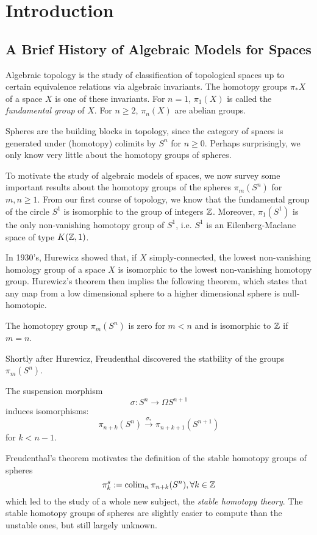 \chapter{Introduction}

\section{A Brief History of Algebraic Models for Spaces}

Algebraic topology is the study of classification of topological spaces up to certain equivalence relations via algebraic invariants. 
The homotopy groups $\pi_* X$ of a space $X$ is one of these invariants.
For $n=1$, $\pi_1(X)$ is called the \emph{fundamental group} of $X$. For $n\geq 2$, $\pi_n(X)$ are abelian groups. 

Spheres are the building blocks in topology, since the category of spaces is generated under (homotopy) colimits by $S^n$ for $n\geq 0$. Perhaps surprisingly, we only know very little about the homotopy groups of spheres. 

To motivate the study of algebraic models of spaces, we now survey some important results about the homotopy groups of the spheres $\pi_m(S^n)$ for $m,n \geq 1$.
From our first course of topology, we know that the fundamental group of the circle $S^1$ is isomorphic to the group of integers ${\mathbb{Z}}$. Moreover, $\pi_1( S^1)$ is the only non-vanishing homotopy group of $S^1$, i.e. $S^1$ is an Eilenberg-Maclane space of type $K({\mathbb{Z}},1)$.

In 1930's, Hurewicz showed that, if $X$ simply-connected,  the lowest non-vanishing homology group of a space $X$ is isomorphic to the lowest non-vanishing homotopy group. Hurewicz's theorem then implies the following theorem, which states that any map from a low dimensional sphere to a higher dimensional sphere is null-homotopic.
\begin{theorem}
    [Hurewicz]
    The homotopry group $\pi_m(S^n)$ is zero for $m<n$ and is isomorphic to ${\mathbb{Z}}$ if $m=n$.
\end{theorem}
\clearpage

Shortly after Hurewicz, Freudenthal discovered the statbility of the groups $\pi_m(S^n)$.
\begin{theorem}
    The suspension morphism 
    $$
    \sigma: S^n \to \Omega S^{n+1}
    $$
    induces isomorphisms:
    $$
    \pi_{n+k}(S^n) \xrightarrow{\sigma_*} 
    \pi_{n+k+1}(S^{n+1})
    $$
    for $k<n-1$.
\end{theorem}
Freudenthal's theorem motivates the definition of the stable homotopy groups of spheres
$$
\pi^{s}_{k}:= \operatorname{colim}_n \pi_{n+k}(S^n), \forall k \in {\mathbb{Z}}
$$
which led to the study of a whole new subject, the \emph{stable homotopy theory}.
The stable homotopy groups of spheres are slightly easier to compute than the unstable ones, but still largely unknown.

